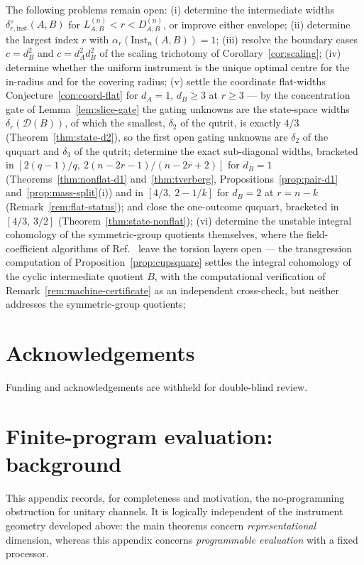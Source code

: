 \documentclass[11pt,a4paper]{article}
\newcommand{\Inst}{\mathrm{Inst}}
\begin{document}
The following problems remain open: (i) determine the intermediate widths $\delta_{r,\mathrm{inst}}^{\diamond}(A,B)$ for $L_{A,B}^{(n)}<r<D_{A,B}^{(n)}$, or improve either envelope; (ii) determine the largest index $r$ with $\alpha_r(\Inst_n(A,B))=1$; (iii) resolve the boundary cases $c=d_B^2$ and $c=d_A^2d_B^2$ of the scaling trichotomy of Corollary~\ref{cor:scaling}; (iv) determine whether the uniform instrument is the unique optimal centre for the in-radius and for the covering radius; (v) settle the coordinate flat-widths Conjecture~\ref{con:coord-flat} for $d_A=1$, $d_B\ge3$ at $r\ge3$ --- by the concentration gate of Lemma~\ref{lem:slice-gate} the gating unknowns are the state-space widths $\delta_r(\mathcal D(B))$, of which the smallest, $\delta_2$ of the qutrit, is exactly $4/3$ (Theorem~\ref{thm:state-d2}), so the first open gating unknowns are $\delta_2$ of the ququart and $\delta_3$ of the qutrit; determine the exact sub-diagonal widths, bracketed in $[2(q-1)/q,\ 2(n-2r-1)/(n-2r+2)]$ for $d_B=1$ (Theorems~\ref{thm:nonflat-d1} and~\ref{thm:tverberg}, Propositions~\ref{prop:pair-d1} and~\ref{prop:mass-split}(i)) and in $[4/3,\ 2-1/k]$ for $d_B=2$ at $r=n-k$ (Remark~\ref{rem:flat-status}); and close the one-outcome ququart, bracketed in $[4/3,\,3/2]$ (Theorem~\ref{thm:state-nonflat}); (vi) determine the unstable integral cohomology of the symmetric-group quotients themselves, where the field-coefficient algorithms of Ref.~\cite{GuerraJana2025} leave the torsion layers open --- the transgression computation of Proposition~\ref{prop:cupsquare} settles the integral cohomology of the cyclic intermediate quotient $B$, with the computational verification of Remark~\ref{rem:machine-certificate} as an independent cross-check, but neither addresses the symmetric-group quotients;

\section*{Acknowledgements}
Funding and acknowledgements are withheld for double-blind review.

\appendix

\section{Finite-program evaluation: background}
\label{app:no-programming}

This appendix records, for completeness and motivation, the no-programming obstruction for unitary channels. It is logically independent of the instrument geometry developed above: the main theorems concern \emph{representational} dimension, whereas this appendix concerns \emph{programmable evaluation} with a fixed processor.
\end{document}
